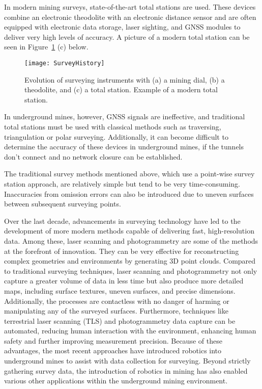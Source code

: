 In modern mining surveys, state-of-the-art total stations are used. These devices combine an electronic theodolite with an electronic distance sensor and are often equipped with electronic data storage, laser sighting, and GNSS modules to deliver very high levels of accuracy\cite{vanWegen2018}. A picture of a modern total station can be seen in Figure~\ref{fig:SurveyHistory} (c) below.

\begin{figure}[!h]
    \centering
    \texttt{[image: SurveyHistory]}
    \caption[Example of a modern total station]{
    Evolution of surveying instruments with (a) a mining dial, (b) a theodolite, and (c) a total station\cite{MinersDial, Topcon2020, NOAA2024}.
    Example of a modern total station\cite{Topcon2020}.
    }
    \label{fig:SurveyHistory}
\end{figure}


In underground mines, however, GNSS signals are ineffective, and traditional total stations must be used with classical methods such as traversing, triangulation or polar surveying. Additionally, it can become difficult to determine the accuracy of these devices in underground mines, if the tunnels don’t connect and no network closure can be established\cite{Laguillo2022, Buzatu2020}.

The traditional survey methods mentioned above, which use a point-wise survey station approach, are relatively simple but tend to be very time-consuming. Inaccuracies from omission errors can also be introduced due to uneven surfaces between subsequent surveying points\cite{Sobak2015}.

Over the last decade, advancements in surveying technology have led to the development of more modern methods capable of delivering fast, high-resolution data. Among these, laser scanning and photogrammetry are some of the methods at the forefront of innovation. They can be very effective for reconstructing complex geometries and environments by generating 3D point clouds. Compared to traditional surveying techniques, laser scanning and photogrammetry not only capture a greater volume of data in less time but also produce more detailed maps, including surface textures, uneven surfaces, and precise dimensions. Additionally, the processes are contactless with no danger of harming or manipulating any of the surveyed surfaces. Furthermore, techniques like terrestrial laser scanning (TLS) and photogrammetry data capture can be automated, reducing human interaction with the environment, enhancing human safety and further improving measurement precision. Because of these advantages, the most recent approaches have introduced robotics into underground mines to assist with data collection for surveying. Beyond strictly gathering survey data, the introduction of robotics in mining has also enabled various other applications within the underground mining environment\cite{Ellmann2021}. 




